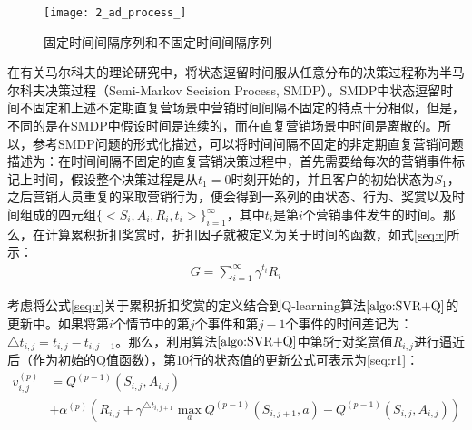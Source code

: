 \begin{figure}[htbp]
\centering
\texttt{[image: 2\_ad\_process\_]}
\caption{固定时间间隔序列和不固定时间间隔序列}
\label{fig:2_ad_process_}
\end{figure}

在有关马尔科夫的理论研究中，将状态逗留时间服从任意分布的决策过程称为半马尔科夫决策过程（Semi-Markov Secision Process, SMDP）\citep{guo2015survey}。SMDP中状态逗留时间不固定和上述不定期直复营场景中营销时间间隔不固定的特点十分相似，但是，不同的是在SMDP中假设时间是连续的，而在直复营销场景中时间是离散的。所以，参考SMDP问题的形式化描述，可以将时间间隔不固定的非定期直复营销问题描述为：在时间间隔不固定的直复营销决策过程中，首先需要给每次的营销事件标记上时间，假设整个决策过程是从$t_{1}=0$时刻开始的，并且客户的初始状态为$S_{1}$，之后营销人员重复的采取营销行为，便会得到一系列的由状态、行为、奖赏以及时间组成的四元组$\{<S_{i},A_{i},R_{i},t_{i}>\}_{i=1}^{\infty}$，其中$t_{i}$是第$i$个营销事件发生的时间。那么，在计算累积折扣奖赏时，折扣因子就被定义为关于时间的函数，如式\eqref{seq:r}所示：
\begin{equation}\label{seq:r}
\begin{aligned}
G=\sum_{i=1}^{\infty} \gamma^{t_{i}}R_{i}
\end{aligned}
\end{equation}

考虑将公式\eqref{seq:r}关于累积折扣奖赏的定义结合到Q-learning算法$\ref{algo:SVR+Q}$的更新中。如果将第$i$个情节中的第$j$个事件和第$j-1$个事件的时间差记为：$\triangle t_{i,j} = t_{i,j}-t_{i,j-1}$。那么，利用算法$\ref{algo:SVR+Q}$中第5行对奖赏值$R_{i,j}$进行逼近后（作为初始的Q值函数），第10行的状态值的更新公式可表示为\eqref{seq:r1}：
\begin{equation}\label{seq:r1}
\begin{aligned}
v_{i,j}^{(p)}&=Q^{(p-1)}(S_{i,j},A_{i,j}) \\
&+  \alpha^{(p)} (R_{i,j} + \gamma^{\triangle t_{i,j+1}} \max_{a} Q^{(p-1)}(S_{i,j+1},a)-Q^{(p-1)}(S_{i,j},A_{i,j}))\\
\end{aligned}
\end{equation}

